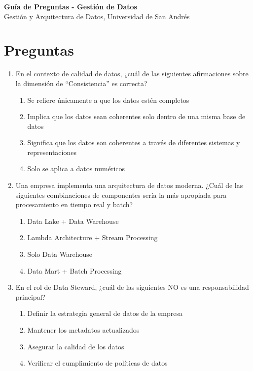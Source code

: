 \documentclass[12pt]{article}
\begin{document}
\begin{center}
  {\LARGE \textbf{Guía de Preguntas - Gestión de Datos}}\\[0.5em]
  {Gestión y Arquitectura de Datos, Universidad de San Andrés}
\end{center}

\section*{Preguntas}

\begin{enumerate}[label=\arabic*.]

\item En el contexto de calidad de datos, ¿cuál de las siguientes afirmaciones sobre la dimensión de ``Consistencia'' es correcta?
\begin{enumerate}
    \item Se refiere únicamente a que los datos estén completos
    \item Implica que los datos sean coherentes solo dentro de una misma base de datos
    \item Significa que los datos son coherentes a través de diferentes sistemas y representaciones
    \item Solo se aplica a datos numéricos
\end{enumerate}

\item Una empresa implementa una arquitectura de datos moderna. ¿Cuál de las siguientes combinaciones de componentes sería la más apropiada para procesamiento en tiempo real y batch?
\begin{enumerate}
    \item Data Lake + Data Warehouse
    \item Lambda Architecture + Stream Processing
    \item Solo Data Warehouse
    \item Data Mart + Batch Processing
\end{enumerate}

\item En el rol de Data Steward, ¿cuál de las siguientes NO es una responsabilidad principal?
\begin{enumerate}
    \item Definir la estrategia general de datos de la empresa
    \item Mantener los metadatos actualizados
    \item Asegurar la calidad de los datos
    \item Verificar el cumplimiento de políticas de datos
\end{enumerate}


\end{enumerate}
\end{document}
